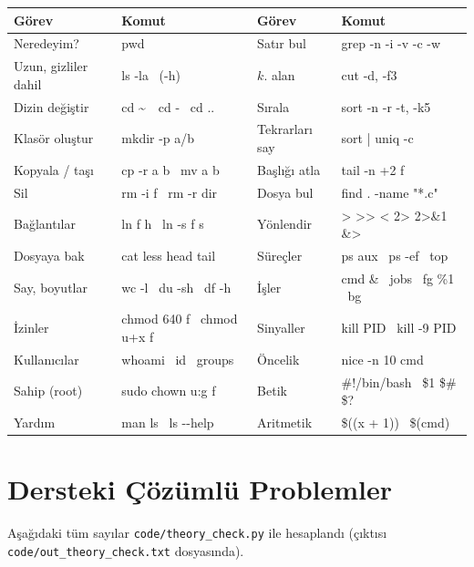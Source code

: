 \documentclass[11pt,a4paper]{article}
\begin{document}
\begin{center}
\vspace{0.6em}
\renewcommand{\arraystretch}{1.15}
\begin{tabularx}{\linewidth}{@{}>{\raggedright\arraybackslash}p{3.0cm}>{\ttfamily\raggedright\arraybackslash}X>{\raggedright\arraybackslash}p{3.0cm}>{\ttfamily\raggedright\arraybackslash}X@{}}
\toprule
\textbf{Görev} & \textbf{\rmfamily Komut} & \textbf{Görev} & \textbf{\rmfamily Komut} \\
\midrule
Neredeyim? & pwd & Satır bul & grep -n -i -v -c -w \\
Uzun, gizliler dahil & ls -la \ (-h) & $k$. alan & cut -d, -f3 \\
Dizin değiştir & cd \textasciitilde\ \ cd - \ cd .. & Sırala & sort -n -r -t, -k5 \\
Klasör oluştur & mkdir -p a/b & Tekrarları say & sort | uniq -c \\
Kopyala / taşı & cp -r a b \ mv a b & Başlığı atla & tail -n +2 f \\
Sil & rm -i f \ rm -r dir & Dosya bul & find . -name "*.c" \\
Bağlantılar & ln f h \ ln -s f s & Yönlendir & > >> < 2> 2>\&1 \&> \\
Dosyaya bak & cat less head tail & Süreçler & ps aux \ ps -ef \ top \\
Say, boyutlar & wc -l \ du -sh \ df -h & İşler & cmd \& \ jobs \ fg \%1 \ bg \\
İzinler & chmod 640 f \ chmod u+x f & Sinyaller & kill PID \ kill -9 PID \\
Kullanıcılar & whoami \ id \ groups & Öncelik & nice -n 10 cmd \\
Sahip (root) & sudo chown u:g f & Betik & \#!/bin/bash \ \$1 \$\# \$? \\
Yardım & man ls \ ls -{}-help & Aritmetik & \$((x + 1)) \ \$(cmd) \\
\bottomrule
\end{tabularx}
\end{center}

\section{Dersteki Çözümlü Problemler}
\label{sec:lecture}

Aşağıdaki tüm sayılar \texttt{code/theory\_check.py} ile hesaplandı (çıktısı \texttt{code/out\_theory\_check.txt} dosyasında).

\end{document}
